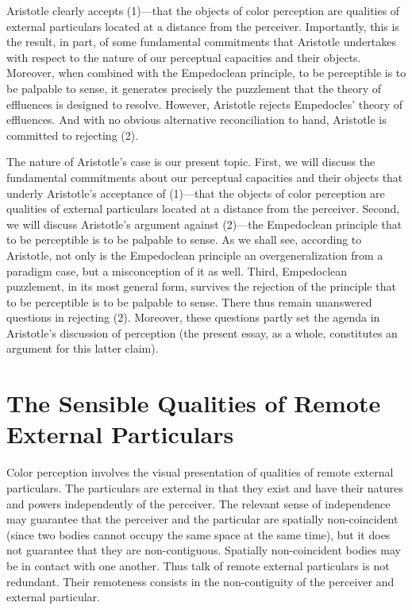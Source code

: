 Aristotle clearly accepts (1)---that the objects of color perception are qualities of external particulars located at a distance from the perceiver. Importantly, this is the result, in part, of some fundamental commitments that Aristotle undertakes with respect to the nature of our perceptual capacities and their objects. Moreover, when combined with the Empedoclean principle, to be perceptible is to be palpable to sense, it generates precisely the puzzlement that the theory of effluences is designed to resolve. However, Aristotle rejects Empedocles' theory of effluences. And with no obvious alternative reconciliation to hand, Aristotle is committed to rejecting (2). 

The nature of Aristotle's case is our present topic. First, we will discuss the fundamental commitments about our perceptual capacities and their objects that underly Aristotle's acceptance of (1)---that the objects of color perception are qualities of external particulars located at a distance from the perceiver. Second, we will discuss Aristotle's argument against (2)---the Empedoclean principle that to be perceptible is to be palpable to sense. As we shall see, according to Aristotle, not only is the Empedoclean principle an overgeneralization from a paradigm case, but a misconception of it as well. Third, Empedoclean puzzlement, in its most general form, survives the rejection of the principle that to be perceptible is to be palpable to sense. There thus remain unanswered questions in rejecting (2). Moreover, these questions partly set the agenda in Aristotle's discussion of perception (the present essay, as a whole, constitutes an argument for this latter claim). 

\section{The Sensible Qualities of Remote External Particulars} %
\label{sec:sensible_qualities_of_remote_external_particulars}

Color perception involves the visual presentation of qualities of remote external particulars. The particulars are external in that they exist and have their natures and powers independently of the perceiver. The relevant sense of independence may guarantee that the perceiver and the particular are spatially non-coincident (since two bodies cannot occupy the same space at the same time), but it does not guarantee that they are non-contiguous. Spatially non-coincident bodies may be in contact with one another. Thus talk of remote external particulars is not redundant. Their remoteness consists in the non-contiguity of the perceiver and external particular.

